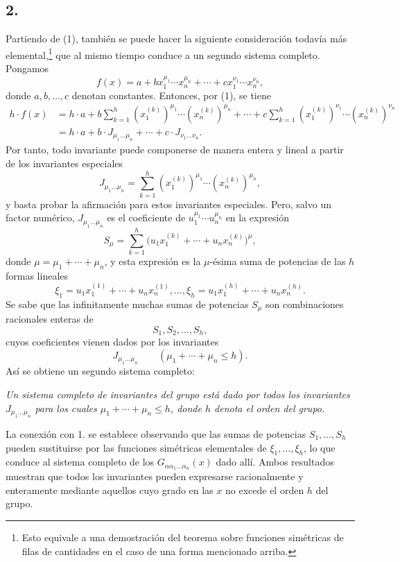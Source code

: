 \documentclass[11pt]{article}
\begin{document}
\subsection*{2.}
Partiendo de (1), también se puede hacer la siguiente consideración todavía más elemental,\footnote{Esto equivale a una demostración del teorema sobre funciones simétricas de filas de cantidades en el caso de una forma mencionado arriba.} que al mismo tiempo conduce a un segundo sistema completo. Pongamos
\[
  f(x)=a+b x_1^{\mu_1}\cdots x_n^{\mu_n}
       +\cdots+c x_1^{\nu_1}\cdots x_n^{\nu_n},
\]
donde $a,b,\ldots,c$ denotan constantes. Entonces, por (1), se tiene
\[
\begin{aligned}
 h\cdot f(x)
 &=h\cdot a+b\sum_{k=1}^{h}(x_1^{(k)})^{\mu_1}\cdots(x_n^{(k)})^{\mu_n}
     +\cdots
     +c\sum_{k=1}^{h}(x_1^{(k)})^{\nu_1}\cdots(x_n^{(k)})^{\nu_n} \\
 &=h\cdot a+b\cdot J_{\mu_1\ldots\mu_n}+\cdots+c\cdot J_{\nu_1\ldots\nu_n}.
\end{aligned}
\]
Por tanto, todo invariante puede componerse de manera entera y lineal a partir de los invariantes especiales
\[
  J_{\mu_1\ldots\mu_n}
  =\sum_{k=1}^{h}(x_1^{(k)})^{\mu_1}\cdots(x_n^{(k)})^{\mu_n},
\]
y basta probar la afirmación para estos invariantes especiales. Pero, salvo un factor numérico, $J_{\mu_1\ldots\mu_n}$ es el coeficiente de $u_1^{\mu_1}
\cdots u_n^{\mu_n}$ en la expresión
\[
  S_\mu=\sum_{k=1}^{h}
  \bigl(u_1x_1^{(k)}+\cdots+u_nx_n^{(k)}\bigr)^{\mu},
\]
donde $\mu=\mu_1+\cdots+\mu_n$, y esta expresión es la $\mu$-ésima suma de potencias de las $h$ formas lineales
\[
  \xi_1=u_1x_1^{(1)}+\cdots+u_nx_n^{(1)},\ldots,
  \xi_h=u_1x_1^{(h)}+\cdots+u_nx_n^{(h)}.
\]
Se sabe que las infinitamente muchas sumas de potencias $S_\mu$ son combinaciones racionales enteras de
\[
  S_1,S_2,\ldots,S_h,
\]
cuyos coeficientes vienen dados por los invariantes
\[
  J_{\mu_1\ldots\mu_n}\qquad(\mu_1+\cdots+\mu_n\le h).
\]
Así se obtiene un segundo sistema completo:

\emph{Un sistema completo de invariantes del grupo está dado por todos los invariantes $J_{\mu_1\ldots\mu_n}$ para los cuales $\mu_1+\cdots+\mu_n\le h$, donde $h$ denota el orden del grupo.}

La conexión con 1. se establece observando que las sumas de potencias $S_1,
\ldots,S_h$ pueden sustituirse por las funciones simétricas elementales de $\xi_1,
\ldots,
\xi_h$, lo que conduce al sistema completo de los $G_{\alpha\alpha_1\ldots\alpha_n}(x)$ dado allí. Ambos resultados muestran que todos los invariantes pueden expresarse racionalmente y enteramente mediante aquellos cuyo grado en las $x$ no excede el orden $h$ del grupo.
\end{document}
